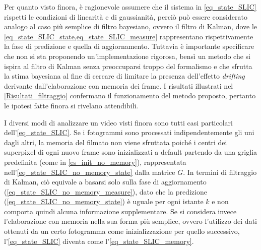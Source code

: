 \documentclass[12pt,a4paper,oneside]{article}
\begin{document}
Per quanto visto finora, è ragionevole assumere che il sistema in \cref{eq_state_SLIC} rispetti le condizioni di linearità e di gaussianità, perciò può essere considerato analogo al caso più semplice di filtro bayesiano, ovvero il filtro di Kalman, dove le \cref{eq_state_SLIC_state,eq_state_SLIC_measure} rappresentano rispettivamente la fase di predizione e quella di aggiornamento. Tuttavia è importante specificare che non si sta proponendo un'implementazione rigorosa, bensì un metodo che si ispira al filtro di Kalman senza preoccuparsi troppo del formalismo e che sfrutta la stima bayesiana al fine di cercare di limitare la presenza dell'effetto \textit{drifting} derivante dall'elaborazione con memoria dei frame. I risultati illustrati nel \cref{Risultati_filtraggio} confermano il funzionamento del metodo proposto, pertanto le ipotesi fatte finora si rivelano attendibili.

\noindent I diversi modi di analizzare un video visti finora sono tutti casi particolari dell'\cref{eq_state_SLIC}. Se i fotogrammi sono processati indipendentemente gli uni dagli altri, la memoria del filmato non viene sfruttata poiché i centri dei superpixel di ogni nuovo frame sono inizializzati a default partendo da una griglia predefinita (come in \cref{es_init_no_memory}), rappresentata nell'\cref{eq_state_SLIC_no_memory_state} dalla matrice $G$. In termini di filtraggio di Kalman, ciò equivale a basarsi solo sulla fase di aggiornamento (\cref{eq_state_SLIC_no_memory_measure}), dato che la predizione (\cref{eq_state_SLIC_no_memory_state}) è uguale per ogni istante $k$ e non comporta quindi alcuna informazione supplementare. Se si considera invece l'elaborazione con memoria nella sua forma più semplice, ovvero l'utilizzo dei dati ottenuti da un certo fotogramma come inizializzazione per quello successivo, l'\cref{eq_state_SLIC} diventa come l'\cref{eq_state_SLIC_memory}.
\end{document}
